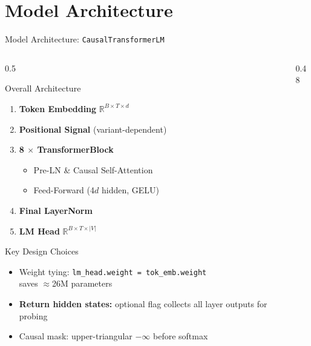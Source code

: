 \documentclass[aspectratio=169, 10pt]{beamer}
\begin{document}
\section{Model Architecture}

\begin{frame}{Model Architecture: \texttt{CausalTransformerLM}}
  \begin{columns}[T]
    \begin{column}{0.5\textwidth}
      \begin{block}{Overall Architecture}
        \begin{enumerate}
          \item \textbf{Token Embedding} \hfill $\mathbb{R}^{B \times T \times d}$
          \item \textbf{Positional Signal} (variant-dependent)
          \item \textbf{8 $\times$ TransformerBlock}
          \begin{itemize}
            \item Pre-LN \& Causal Self-Attention
            \item Feed-Forward (4$d$ hidden, GELU)
          \end{itemize}
          \item \textbf{Final LayerNorm}
          \item \textbf{LM Head} \hfill $\mathbb{R}^{B \times T \times |V|}$
        \end{enumerate}
      \end{block}
      \begin{block}{Key Design Choices}
        \begin{itemize}
          \item \alert{Weight tying:} \texttt{lm\_head.weight = tok\_emb.weight}\\
                saves $\approx$26M parameters
          \item \textbf{Return hidden states:} optional flag collects all layer outputs
                for probing
          \item Causal mask: upper-triangular $-\infty$ before softmax
        \end{itemize}
      \end{block}
    \end{column}
    \begin{column}{0.48\textwidth}

\end{column}
\end{columns}
\end{frame}
\end{document}
